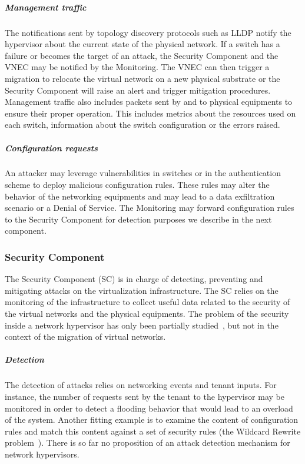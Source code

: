 \subparagraph{Management traffic} 
The notifications sent by topology discovery protocols such as LLDP notify the hypervisor about the current state of the physical network. If a switch has a failure or becomes the target of an attack, the Security Component and the VNEC may be notified by the Monitoring. The VNEC can then trigger a migration to relocate the virtual network on a new physical substrate or the Security Component will raise an alert and trigger mitigation procedures.
Management traffic also includes packets sent by and to physical equipments to ensure their proper operation.
This includes metrics about the resources used on each switch, information about the switch configuration or the errors raised.

\subparagraph{Configuration requests} An attacker may leverage vulnerabilities in switches or in the authentication scheme to deploy malicious configuration rules. These rules may alter the behavior of the networking equipments and may lead to a data exfiltration scenario or a Denial of Service.
The Monitoring may forward configuration rules to the Security Component for detection purposes we describe in the next component.

\subsubsection{Security Component}
The Security Component (SC) is in charge of detecting, preventing and mitigating attacks on the virtualization infrastructure. The SC relies on the monitoring of the infrastructure to collect useful data related to the security of the virtual networks and the physical equipments.
The problem of the security inside a network hypervisor has only been partially studied~\cite{Costa2015}, but not in the context of the migration of virtual networks.

\subparagraph{Detection}
The detection of attacks relies on networking events and tenant inputs.
For instance, the number of requests sent by the tenant to the hypervisor may be monitored in order to detect a flooding behavior that would lead to an overload of the system. Another fitting example is to examine the content of configuration rules and match this content against a set of security rules (\eg the Wildcard Rewrite problem~\cite{Costa2015}).
There is so far no proposition of an attack detection mechanism for network hypervisors.

